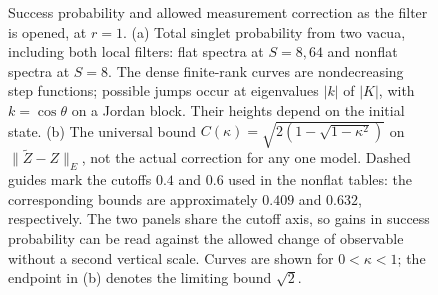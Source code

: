 \documentclass[11pt,a4paper]{article}
\begin{document}
\begin{figure}[t]
\par\smallskip{}
\caption{Success probability and allowed measurement correction as the filter is opened, at $r=1$. (a) Total singlet probability from two vacua, including both local filters: flat spectra at $S=8,64$ and nonflat spectra at $S=8$. The dense finite-rank curves are nondecreasing step functions; possible jumps occur at eigenvalues $|k|$ of $|K|$, with $k=\cos\theta$ on a Jordan block. Their heights depend on the initial state. (b) The universal bound $C(\kappa)=\sqrt{2(1-\sqrt{1-\kappa^2})}$ on $\|\widetilde Z-Z\|_E$, not the actual correction for any one model. Dashed guides mark the cutoffs $0.4$ and $0.6$ used in the nonflat tables: the corresponding bounds are approximately $0.409$ and $0.632$, respectively. The two panels share the cutoff axis, so gains in success probability can be read against the allowed change of observable without a second vertical scale. Curves are shown for $0<\kappa<1$; the endpoint in (b) denotes the limiting bound $\sqrt2$.}
\label{fig:cutoff}
\end{figure}
\end{document}
